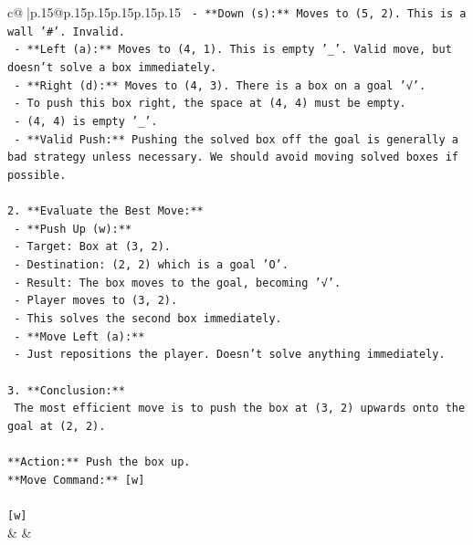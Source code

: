\documentclass{article}
\begin{document}
{\begin{supertabular}{c@{$\;$}|p{.15\linewidth}@{}p{.15\linewidth}p{.15\linewidth}p{.15\linewidth}p{.15\linewidth}p{.15\linewidth}}
{{{\texttt{    {-} **Down (s):** Moves to (5, 2). This is a wall '\#'. Invalid.} \\
\texttt{    {-} **Left (a):** Moves to (4, 1). This is empty '\_'. Valid move, but doesn't solve a box immediately.} \\
\texttt{    {-} **Right (d):** Moves to (4, 3). There is a box on a goal '√'.} \\
\texttt{        {-} To push this box right, the space at (4, 4) must be empty.} \\
\texttt{        {-} (4, 4) is empty '\_'.} \\
\texttt{        {-} **Valid Push:** Pushing the solved box off the goal is generally a bad strategy unless necessary. We should avoid moving solved boxes if possible.} \\
\\ 
\texttt{2.  **Evaluate the Best Move:**} \\
\texttt{    {-} **Push Up (w):**} \\
\texttt{        {-} Target: Box at (3, 2).} \\
\texttt{        {-} Destination: (2, 2) which is a goal 'O'.} \\
\texttt{        {-} Result: The box moves to the goal, becoming '√'.} \\
\texttt{        {-} Player moves to (3, 2).} \\
\texttt{        {-} This solves the second box immediately.} \\
\texttt{    {-} **Move Left (a):**} \\
\texttt{        {-} Just repositions the player. Doesn't solve anything immediately.} \\
\\ 
\texttt{3.  **Conclusion:**} \\
\texttt{    The most efficient move is to push the box at (3, 2) upwards onto the goal at (2, 2).} \\
\\ 
\texttt{**Action:** Push the box up.} \\
\texttt{**Move Command:** {[}w{]}} \\
\\ 
\texttt{{[}w{]}} \\
            }
        }
    }
    & & \\ \\


\end{supertabular}}
\end{document}
